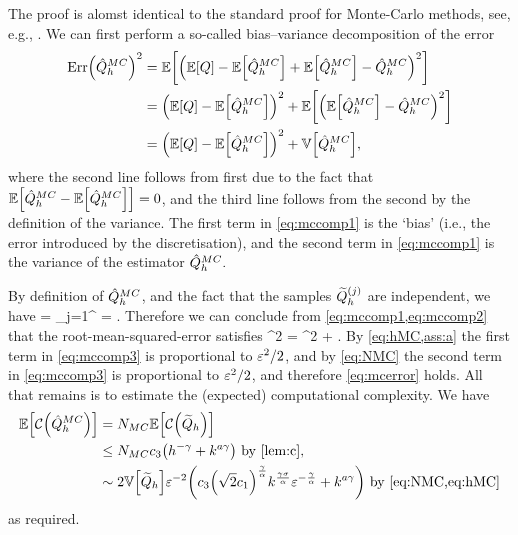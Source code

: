 The proof is alomst identical to the standard proof for Monte-Carlo methods, see, e.g., \cite[Section 2.1]{ClGiScTe:11}. We can first perform a so-called bias--variance decomposition of the error
\begin{align}
\err{\QhatMC}^2 &=  \EXP{ \mleft(\EXP{Q}-\EXP{\QhatMC} + \EXP{\QhatMC} - \QhatMC\mright)^2} \nonumber\\
&= \mleft(\EXP{Q}-\EXP{\QhatMC}\mright)^2 + \EXP{\mleft(\EXP{\QhatMC} - \QhatMC\mright)^2} \nonumber\\
&= \mleft(\EXP{Q} - \EXP{\QhatMC}\mright)^2+\VAR{\QhatMC},\label{eq:mccomp1}
\end{align}
where the second line follows from first due to the fact that $\EXP{\QhatMC - \EXP{\QhatMC}} = 0$, and the third line follows from the second by the definition of the variance. The first term in \cref{eq:mccomp1} is the `bias' (i.e., the error introduced by the discretisation), and the second term in \cref{eq:mccomp1} is the variance of the estimator $\hat{Q}^{MC}_{h}.$

By definition of $\hat{Q}^{MC}_{h}$, and the fact that the samples $\widetilde{Q}_{h}^{(j)}$ are independent, we have
\beq\label{eq:mccomp2}
\VAR{\QhatMC} = \sum_{j=1}^{\NMC}\VAR{\Qhtildesj} =  \VAR{\Qhtilde}.
\eeq
Therefore we can conclude from \cref{eq:mccomp1,eq:mccomp2} that the root-mean-squared-error satisfies
\beq\label{eq:mccomp3}
\err{\QhatMC}^2 = ^2 + \VAR{\Qhtilde}.
\eeq
By \cref{eq:hMC,ass:a} the first term in \cref{eq:mccomp3} is proportional to $\varepsilon^2/2$, and by \cref{eq:NMC} the second term in \cref{eq:mccomp3} is proportional to $\varepsilon^2/2$, and therefore \cref{eq:mcerror} holds. All that remains is to estimate the (expected) computational complexity. We have
\begin{align*}
  \EXP{\Cost{\QhatMC}} &= \NMC \EXP{\Cost{\Qhtilde}}\\
  &\leq \NMC \cth \mleft(h^{-\gamma} + k^{a\gamma}\mright) \text{ by \cref{lem:c},}\\
  &\sim 2\VAR{\Qhtilde}\eps^{-2} \mleft(\cth \mleft(\sqrt{2} \co\mright)^{\frac\gamma\alpha}k^{\frac{\gamma\sigma}{\alpha}}\eps^{-\frac\gamma\alpha} + k^{a\gamma}\mright)\text{ by \cref{eq:NMC,eq:hMC}}
\end{align*}
as required.
\epf

